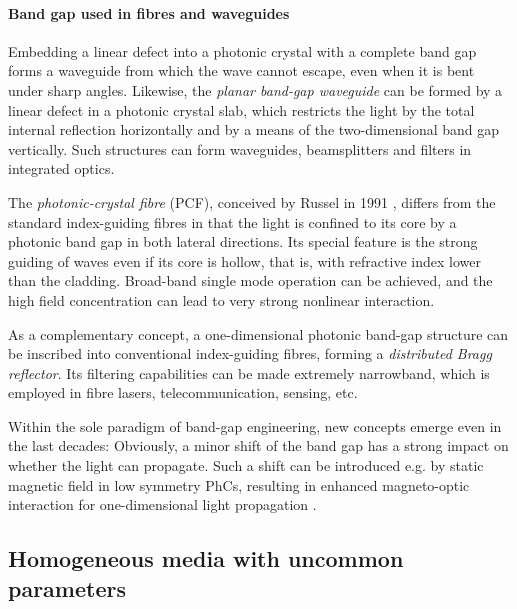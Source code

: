 \paragraph{Band gap used in fibres and waveguides} %
Embedding a linear defect into a photonic crystal with a complete band gap forms a waveguide from which the wave cannot escape, even when it is bent under sharp angles.
Likewise, the \textit{planar band-gap waveguide} can be formed by a linear defect in a photonic crystal slab, which restricts the light by the total internal reflection horizontally and by a means of the two-dimensional band gap vertically. Such structures can form waveguides, beamsplitters and filters in integrated optics. 

The \textit{photonic-crystal fibre} (PCF), conceived by Russel in 1991 \cite{russell2007photonic}, differs from the standard index-guiding fibres in that the light is confined to its core by a photonic band gap in both lateral directions. 
Its special feature is the strong guiding of waves even if its core is hollow, that is, with refractive index lower than the cladding. Broad-band single mode operation can be achieved, and the high field concentration can lead to very strong nonlinear interaction.

As a complementary concept, a one-dimensional photonic band-gap structure can be inscribed into conventional index-guiding fibres, forming a \textit{distributed Bragg reflector}. Its filtering capabilities can be made extremely narrowband, which is employed in fibre lasers, telecommunication, sensing, etc. %

Within the sole paradigm of band-gap engineering, new concepts emerge even in the last decades: Obviously, a minor shift of the band gap has a strong impact on whether the light can propagate. Such a shift can be introduced e.g. by static magnetic field in low symmetry PhCs, resulting in enhanced magneto-optic interaction for one-dimensional light propagation \cite{vanwolleghem2009unidirectional}.


\subsection{Homogeneous media with uncommon parameters} 
